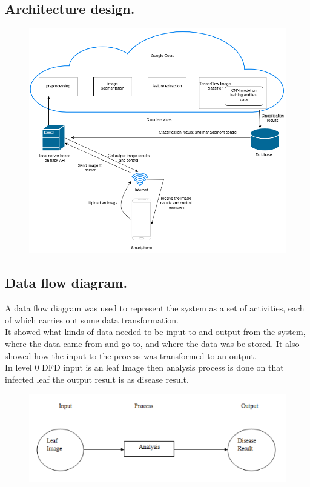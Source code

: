 \documentclass[11pt]{report}
\begin{document}
\newpage
\subsection{Architecture design.}

\begin{figure}[h]
	\centerline{\small 
		\includegraphics[height=0.5\textheight]  {arch}}
\end{figure}

\subsection{Data flow diagram.}
A data flow diagram was used to represent the system as a set of activities, each of which carries out some data transformation.\\

It showed what kinds of data needed to be input to and output from the system, where the data came from and go to, and where the data was be stored. It also showed how the input to the process was transformed to an output.\\

In level 0 DFD input is an leaf Image then analysis process is
done on that infected leaf the output result is as disease result.\\
\begin{figure}[h]
	\centerline{\small 
		\includegraphics[height=0.15\textheight]  {e}}
\end{figure}
\end{document}
